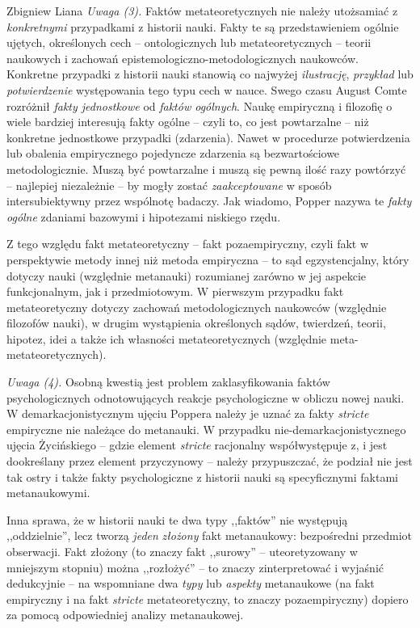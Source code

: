 \begin{artplenv}{Zbigniew Liana}
\textit{Uwaga (3).} Faktów metateoretycznych nie należy utożsamiać z \textit{konkretnymi} przypadkami z historii nauki.
Fakty te są przedstawieniem ogólnie ujętych, określonych cech -- ontologicznych lub metateoretycznych -- teorii naukowych
i zachowań epistemologiczno-metodologicznych naukowców. Konkretne przypadki z historii nauki stanowią co najwyżej
\textit{ilustrację}, \textit{przykład} lub \textit{potwierdzenie} występowania tego typu cech w nauce. Swego czasu August
Comte rozróżnił \textit{fakty jednostkowe} od \textit{faktów ogólnych}. Naukę empiryczną i filozofię o wiele bardziej
interesują fakty ogólne -- czyli to, co jest powtarzalne -- niż konkretne jednostkowe przypadki (zdarzenia). Nawet w
procedurze potwierdzenia lub obalenia empirycznego pojedyncze zdarzenia są bezwartościowe metodologicznie. Muszą być
powtarzalne i muszą się pewną ilość razy powtórzyć -- najlepiej niezależnie -- by mogły zostać \textit{zaakceptowane} w
sposób intersubiektywny przez wspólnotę badaczy. Jak wiadomo, Popper nazywa te \textit{fakty ogólne} zdaniami bazowymi i
hipotezami niskiego rzędu.

Z tego względu fakt metateoretyczny -- fakt pozaempiryczny, czyli fakt w perspektywie metody innej niż metoda empiryczna
– to sąd egzystencjalny, który dotyczy nauki (względnie metanauki) rozumianej zarówno w jej aspekcie funkcjonalnym, jak
i przedmiotowym. W pierwszym przypadku fakt metateoretyczny dotyczy zachowań metodologicznych naukowców (względnie
filozofów nauki), w drugim wystąpienia określonych sądów, twierdzeń, teorii, hipotez, idei a także ich własności
metateoretycznych (względnie meta-metateoretycznych).

\textit{Uwaga (4).} Osobną kwestią jest problem zaklasyfikowania faktów psychologicznych odnotowujących reakcje
psychologiczne w obliczu nowej nauki. W demarkacjonistycznym ujęciu Poppera należy je uznać za fakty \textit{stricte}
empiryczne nie należące do metanauki. W przypadku nie-demarkacjonistycznego ujęcia Życińskiego -- gdzie element
\textit{stricte} racjonalny współwystępuje z, i jest dookreślany przez element przyczynowy -- należy przypuszczać, że
podział nie jest tak ostry i także fakty psychologiczne z historii nauki są specyficznymi faktami metanaukowymi.

Inna sprawa, że w historii nauki te dwa typy ,,faktów'' nie występują ,,oddzielnie'', lecz tworzą \textit{jeden}
\textit{złożony} fakt metanaukowy: bezpośredni przedmiot obserwacji. Fakt złożony (to znaczy fakt ,,surowy'' –
uteoretyzowany w mniejszym stopniu) można ,,rozłożyć'' -- to znaczy zinterpretować i wyjaśnić dedukcyjnie -- na wspomniane
dwa \textit{typy} lub\textit{ aspekty} metanaukowe (na fakt empiryczny i na fakt \textit{stricte} metateoretyczny, to znaczy
pozaempiryczny) dopiero za pomocą odpowiedniej analizy metanaukowej.


\end{artplenv}
